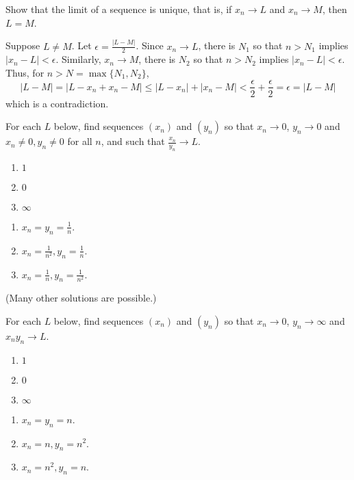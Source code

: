 \documentclass[11pt,dvipsnames]{book}
\numberwithin{figure}{section} %
\numberwithin{table}{section} %
\begin{document}
\begin{exercise}
Show that the limit of a sequence is unique, that is, if $x_{n}\rightarrow L$ and $x_{n}\rightarrow M$, then $L=M$.
\begin{solution}
Suppose $L\neq M$. Let $\epsilon=\frac{|L-M|}{2}$. Since $x_{n}\rightarrow L$, there is $N_1$ so that $n> N_1$ implies $|x_{n}-L|<\epsilon$. Similarly, $x_{n}\rightarrow M$, there is $N_2$ so that $n> N_2$ implies $|x_{n}-L|<\epsilon$. Thus, for $n>N= \max\{N_1,N_2\}$,
\[
|L-M|=|L-x_{n}+x_{n}-M|\leq |L-x_{n}|+|x_{n}-M|<\frac{\epsilon}{2}+\frac{\epsilon}{2} = \epsilon = |L-M|
\]
which is a contradiction.
\end{solution}
\end{exercise}

 \begin{exercise}
For each $L$ below, find sequences $(x_{n})$ and $(y_{n})$ so that $x_{n}\rightarrow 0$, $y_{n}\rightarrow 0$ and $x_{n}\neq 0, y_n \neq 0$ for all $n$, and such that $\frac{x_{n}}{y_{n}}\rightarrow L$.
\begin{enumerate}[label=(\alph*)]
\item $1$
\item $0$
\item $\infty$
\end{enumerate}
\begin{solution}
\begin{enumerate}[label=(\alph*)]
\item $x_n=y_n=\frac{1}{n}$.
\item $x_n=\frac{1}{n^2}, y_n=\frac{1}{n}$.
\item $x_n=\frac{1}{n}, y_n=\frac{1}{n^2}$.
\end{enumerate}
(Many other solutions are possible.)
\end{solution}
\end{exercise}

 \begin{exercise}
For each $L$ below, find sequences $(x_{n})$ and $(y_{n})$ so that $x_{n}\rightarrow 0$, $y_{n}\rightarrow \infty$ and $x_{n}y_{n}\rightarrow L$.
\begin{enumerate}[label=(\alph*)]
\item $1$
\item $0$
\item $\infty$
\end{enumerate}
\begin{solution}
\begin{enumerate}[label=(\alph*)]
\item $x_n=y_n=n$.
\item $x_n=n, y_n=n^2$.
\item $x_n=n^2, y_n=n$.
\end{enumerate}
\end{solution}
\end{exercise}
\end{document}
